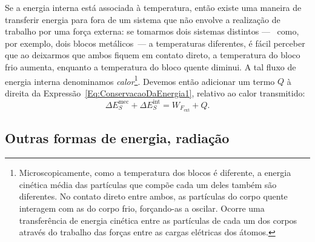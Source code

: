 Se a energia interna está associada à temperatura, então existe uma maneira de transferir energia para fora de um sistema que não envolve a realização de trabalho por uma força externa: se tomarmos dois sistemas distintos ---~ como, por exemplo, dois blocos metálicos~--- a temperaturas diferentes, é fácil perceber que ao deixarmos que ambos fiquem em contato direto, a temperatura do bloco frio aumenta, enquanto a temperatura do bloco quente diminui. A tal fluxo de energia interna denominamos \emph{calor}\footnote{Microscopicamente, como a temperatura dos blocos é diferente, a energia cinética média das partículas que compõe cada um deles também são diferentes. No contato direto entre ambos, as partículas do corpo quente interagem com as do corpo frio, forçando-as a oscilar. Ocorre uma transferência de energia cinética entre as partículas de cada um dos corpos através do trabalho das forças entre as cargas elétricas dos átomos.}. Devemos então adicionar um termo $Q$ à direita da Expressão~\eqref{Eq:ConservacaoDaEnergia1}, relativo ao calor transmitido:
    \begin{equation}\label{Eq:ConservacaoDaEnergia1Q}
    \Delta E_S^{\text{mec}} + \Delta E_S^{\text{int}} = W_{F_{\text{ext}}} + Q.
\end{equation}


\subsection{Outras formas de energia, radiação}

